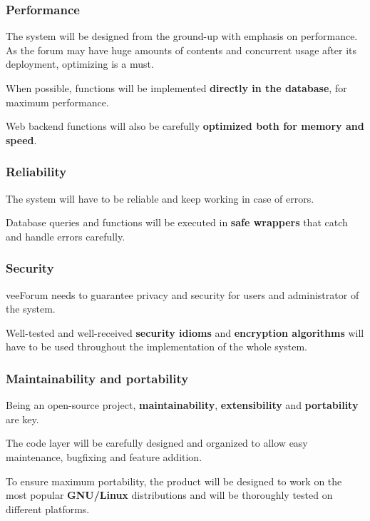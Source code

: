 \documentclass[12pt]{report}
\renewcommand\emph{\textbf}
\begin{document}
                \subsubsection{Performance}
                    The system will be designed from the ground-up with emphasis on performance. As the forum may have huge amounts of contents and concurrent usage after its deployment, optimizing is a must.

                    When possible, functions will be implemented \emph{directly in the database}, for maximum performance.

                    Web backend functions will also be carefully \emph{optimized both for memory and speed}.

                \subsubsection{Reliability}
                    The system will have to be reliable and keep working in case of errors.

                    Database queries and functions will be executed in \emph{safe wrappers} that catch and handle errors carefully.

                \subsubsection{Security}
                    veeForum needs to guarantee privacy and security for users and administrator of the system.

                    Well-tested and well-received \emph{security idioms} and \emph{encryption algorithms} will have to be used throughout the implementation of the whole system.

                \subsubsection{Maintainability and portability}
                    Being an open-source project, \emph{maintainability}, \emph{extensibility} and \emph{portability} are key.

                    The code layer will be carefully designed and organized to allow easy maintenance, bugfixing and feature addition.

                    To ensure maximum portability, the product will be designed to work on the most popular \emph{GNU/Linux} distributions and will be thoroughly tested on different platforms.
\end{document}
